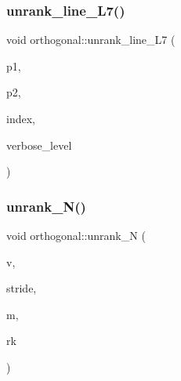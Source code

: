 \subsubsection{\texorpdfstring{unrank\+\_\+line\+\_\+\+L7()}{unrank\_line\_L7()}}
{\footnotesize\ttfamily void orthogonal\+::unrank\+\_\+line\+\_\+\+L7 (\begin{DoxyParamCaption}\item[{\mbox{\hyperlink{galois_8h_a09fddde158a3a20bd2dcadb609de11dc}{I\+NT}} \&}]{p1,  }\item[{\mbox{\hyperlink{galois_8h_a09fddde158a3a20bd2dcadb609de11dc}{I\+NT}} \&}]{p2,  }\item[{\mbox{\hyperlink{galois_8h_a09fddde158a3a20bd2dcadb609de11dc}{I\+NT}}}]{index,  }\item[{\mbox{\hyperlink{galois_8h_a09fddde158a3a20bd2dcadb609de11dc}{I\+NT}}}]{verbose\+\_\+level }\end{DoxyParamCaption})}

\mbox{\label{classorthogonal_ad17cb7e02c41097c35ce16ed4d9f14bf}} 
\subsubsection{\texorpdfstring{unrank\+\_\+\+N()}{unrank\_N()}}
{\footnotesize\ttfamily void orthogonal\+::unrank\+\_\+N (\begin{DoxyParamCaption}\item[{\mbox{\hyperlink{galois_8h_a09fddde158a3a20bd2dcadb609de11dc}{I\+NT}} $\ast$}]{v,  }\item[{\mbox{\hyperlink{galois_8h_a09fddde158a3a20bd2dcadb609de11dc}{I\+NT}}}]{stride,  }\item[{\mbox{\hyperlink{galois_8h_a09fddde158a3a20bd2dcadb609de11dc}{I\+NT}}}]{m,  }\item[{\mbox{\hyperlink{galois_8h_a09fddde158a3a20bd2dcadb609de11dc}{I\+NT}}}]{rk }\end{DoxyParamCaption})}

\mbox{\label{classorthogonal_ac39ac9cea140f569c2b78ad01310b4b6}} 
